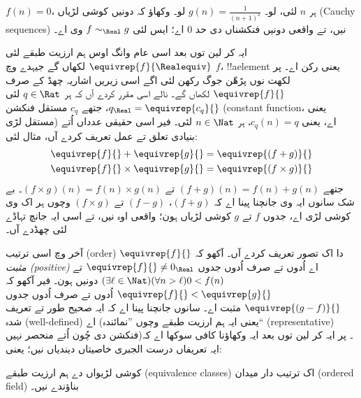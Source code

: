 \documentclass[../../../include/open-logic-section]{subfiles}
\begin{document}
\begin{prob}
$f(n) = 0$، ہر $n$ لئی، لو۔ $g(n) = \frac{1}{(n+1)^2}$ لو۔ وکھاؤ
کہ دونیں کوشی لڑیاں (Cauchy sequences) نیں، تے واقعی دونیں فنکشناں دی حد $0$ اے؛ ایس لئی
$f \sim_\Real g$ وی اے۔
\end{prob}

ایہ کر لین توں بعد اسی عام وانگ اوس ہم ارزیت طبقے لئی
$\equivrep{f}{\Realequiv}$ لکھاں گے جیہدے وچ $f$، !!a{element} یعنی رکن اے۔
پر لکھت نوں پڑھّن جوگ رکھن لئی اگے اسی زیریں اشاریہ چھڈ کے صرف
$\equivrep{f}{}$ لکھاں گے۔ نالے اسی مقرر کردے آں کہ ہر $q \in \Rat$
لئی $q_{\Real} = \equivrep{c_{q}}{}$، جتھے $c_{q}$ مستقل فنکشن
(constant function، یعنی مستقل لڑی) اے،
یعنی $c_q(n) = q$، ہر $n \in \Nat$ لئی۔ فیر اسی حقیقی عدداں اُتے
بنیادی تعلق تے عمل تعریف کردے آں، مثال لئی:
\begin{align*}
	\equivrep{f}{} + \equivrep{g}{} &= 	\equivrep{(f + g)}{} \\
	\equivrep{f}{} \times 	\equivrep{g}{} &= \equivrep{(f \times g)}{}
\end{align*}
جتھے $(f + g)(n) = f(n) + g(n)$ تے $(f \times g)(n) = f(n) \times
g(n)$۔ بے شک سانوں ایہ وی جانچنا پینا اے کہ $(f + g)$، $(f-g)$ تے
$(f\times g)$ وچوں ہر اک وی کوشی لڑی اے، جدوں $f$ تے $g$ کوشی لڑیاں
ہون؛ واقعی اوہ نیں، تے اسی ایہ جانچ تہاڈے لئی چھڈدے آں۔

آخر وچ اسی ترتیب (order) دا اک تصور تعریف کردے آں۔ آکھو کہ
$\equivrep{f}{}$ \emph{مثبت (positive)} اے اُدوں تے صرف اُدوں جدوں
$\equivrep{f}{}\neq 0_\Real$ تے
$(\exists \ell \in \Nat)(\forall n > \ell)0 < f(n)$ دونیں ہون۔
فیر آکھو کہ $\equivrep{f}{} < \equivrep{g}{}$ اُدوں تے صرف اُدوں
جدوں $\equivrep{(g - f)}{}$ مثبت اے۔ سانوں جانچنا پینا اے کہ ایہ
صحیح طور تے تعریف شدہ (well-defined) اے (یعنی ایہ ہم ارزیت طبقے وچوں ”نمائندہ“ (representative) فنکشن
دی چُون اُتے منحصر نہیں)۔
پر ایہ کر لین توں بعد ایہ وکھاؤنا کافی سوکھا اے کہ ایہ تعریفاں درست
الجبری خاصیتاں دیندیاں نیں؛ یعنی:
\begin{thm}
کوشی لڑیواں دے ہم ارزیت طبقے (equivalence classes) اک ترتیب دار میدان
(ordered field) بناؤندے نیں۔
\end{thm}
\end{document}
